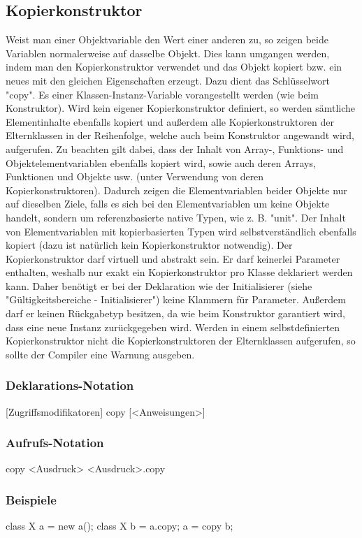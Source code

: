 \subsection{Kopierkonstruktor}
Weist man einer Objektvariable den Wert einer anderen zu, so zeigen beide Variablen normalerweise auf dasselbe Objekt.
Dies kann umgangen werden, indem man den Kopierkonstruktor verwendet und das Objekt kopiert bzw. ein neues mit den gleichen
Eigenschaften erzeugt.
Dazu dient das Schlüsselwort "copy". Es einer Klassen-Instanz-Variable vorangestellt werden (wie beim Konstruktor).
Wird kein eigener Kopierkonstruktor definiert, so werden sämtliche Elementinhalte ebenfalls kopiert und außerdem
alle Kopierkonstruktoren der Elternklassen in der Reihenfolge, welche auch beim Konstruktor angewandt wird, aufgerufen.
Zu beachten gilt dabei, dass der Inhalt von Array-, Funktions- und Objektelementvariablen ebenfalls kopiert wird, sowie auch deren
Arrays, Funktionen und Objekte usw. (unter Verwendung von deren Kopierkonstruktoren). Dadurch zeigen die Elementvariablen beider Objekte nur auf
dieselben Ziele, falls es sich bei den Elementvariablen um keine Objekte handelt, sondern um referenzbasierte native Typen, wie z. B. "unit".
Der Inhalt von Elementvariablen mit kopierbasierten Typen wird selbstverständlich ebenfalls kopiert (dazu ist natürlich kein Kopierkonstruktor notwendig).
Der Kopierkonstruktor darf virtuell und abstrakt sein.
Er darf keinerlei Parameter enthalten, weshalb nur exakt ein Kopierkonstruktor pro Klasse deklariert werden kann.
Daher benötigt er bei der Deklaration wie der Initialisierer (siehe "Gültigkeitsbereiche - Initialisierer") keine Klammern für Parameter.
Außerdem darf er keinen Rückgabetyp besitzen, da wie beim Konstruktor garantiert wird, dass eine neue Instanz zurückgegeben wird.
Werden in einem selbstdefinierten Kopierkonstruktor nicht die Kopierkonstruktoren der Elternklassen aufgerufen, so sollte der Compiler eine Warnung ausgeben.

\subsubsection{Deklarations-Notation}
[Zugriffsmodifikatoren] copy { [<Anweisungen>] }

\subsubsection{Aufrufs-Notation}
copy <Ausdruck>
<Ausdruck>.copy

\subsubsection{Beispiele}
class X a = new a();
class X b = a.copy;
a = copy b;

